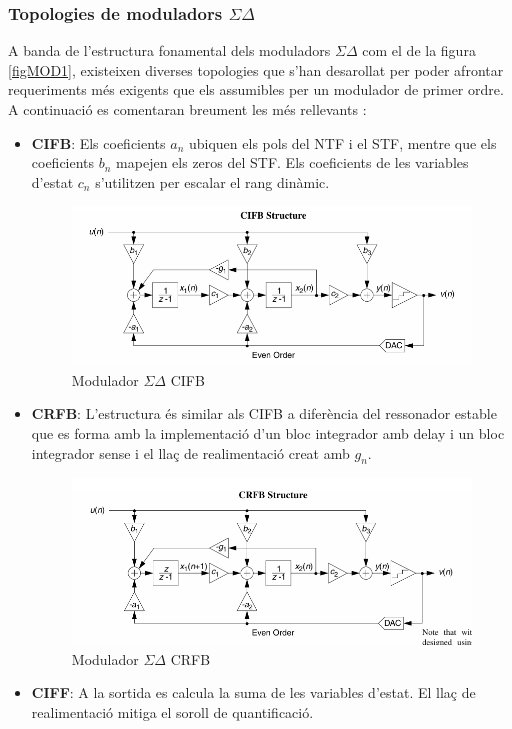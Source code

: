 \subsubsection{Topologies de moduladors $\Sigma \Delta$}
\par A banda de l'estructura fonamental dels moduladors $\Sigma \Delta$ com el de la figura \ref{figMOD1}, existeixen diverses topologies que s'han desarollat per poder afrontar requeriments més exigents que els assumibles per un modulador de primer ordre. A continuació es comentaran breument les més rellevants \cite{SDMToolbox}:
\begin{itemize}
    \item \textbf{CIFB}: Els coeficients $a_n$ ubiquen els pols del NTF i el STF, mentre que els coeficients $b_n$ mapejen els zeros del STF. Els coeficients de les variables d'estat $c_n$ s'utilitzen per escalar el rang dinàmic.
    \begin{figure}[H]
        \centering
        \includegraphics[width=0.5\linewidth]{Images/CIFB.png}
        \caption{Modulador $\Sigma \Delta$ CIFB}
        \label{figCIFB}
    \end{figure}
    \item \textbf{CRFB}: L'estructura és similar als CIFB a diferència del ressonador estable que es forma amb la implementació d'un bloc integrador amb delay i un bloc integrador sense i el llaç de realimentació creat amb $g_n$.
    \begin{figure}[H]
        \centering
        \includegraphics[width=0.5\linewidth]{Images/CRFB.png}
        \caption{Modulador $\Sigma \Delta$ CRFB}
        \label{figCRFB}
    \end{figure}
    \item \textbf{CIFF}: A la sortida es calcula la suma de les variables d'estat. El llaç de realimentació mitiga el soroll de quantificació.
    \begin{figure}[H]

\end{figure}
\end{itemize}
